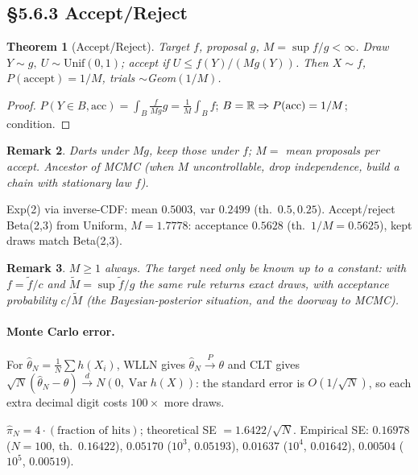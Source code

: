 \documentclass[11pt]{article}
\newtheorem{theorem}{Theorem}[section]
\newtheorem{remark}[theorem]{Remark}
\DeclareMathOperator{\Var}{Var}\DeclareMathOperator{\Cov}{Cov}\DeclareMathOperator{\E}{E}
\newcommand{\convP}{\xrightarrow{P}}\newcommand{\convD}{\xrightarrow{d}}\newcommand{\convAS}{\xrightarrow{a.s.}}
\begin{document}
\subsection*{\S5.6.3 Accept/Reject}
\begin{theorem}[Accept/Reject]
Target $f$, proposal $g$, $M=\sup f/g<\infty$. Draw $Y\sim g,\ U\sim\mathrm{Unif}(0,1)$; accept if $U\le f(Y)/(Mg(Y))$. Then $X\sim f$, $P(\text{accept})=1/M$, trials $\sim$Geom$(1/M)$.
\end{theorem}
\begin{proof}
$P(Y\in B,\text{acc})=\int_B\frac{f}{Mg}g=\frac1M\int_B f$; $B=\mathbb{R}\Rightarrow P(\text{acc})=1/M$; condition.
\end{proof}
\begin{remark}
Darts under $Mg$, keep those under $f$; $M=$ mean proposals per accept. Ancestor of MCMC (when $M$ uncontrollable, drop independence, build a chain with stationary law $f$).
\end{remark}
\begin{simbox}
Exp(2) via inverse-CDF: mean $0.5003$, var $0.2499$ (th.\ $0.5,0.25$). Accept/reject Beta(2,3) from Uniform, $M=1.7778$: acceptance $0.5628$ (th.\ $1/M=0.5625$), kept draws match Beta(2,3).
\end{simbox}

\begin{remark}
$M\ge1$ always. The target need only be known up to a constant: with $f=\tilde f/c$ and $\tilde M=\sup\tilde f/g$ the same rule returns exact draws, with acceptance probability $c/\tilde M$ (the Bayesian-posterior situation, and the doorway to MCMC).
\end{remark}
\paragraph{Monte Carlo error.} For $\hat\theta_N=\frac1N\sum h(X_i)$, WLLN gives $\hat\theta_N\convP\theta$ and CLT gives $\sqrt N(\hat\theta_N-\theta)\convD N(0,\Var h(X))$: the standard error is $O(1/\sqrt N)$, so each extra decimal digit costs $100\times$ more draws.
\begin{simbox}
$\hat\pi_N=4\cdot(\text{fraction of hits})$; theoretical SE $=1.6422/\sqrt N$. Empirical SE: $0.16978$ ($N=100$, th.\ $0.16422$), $0.05170$ ($10^3$, $0.05193$), $0.01637$ ($10^4$, $0.01642$), $0.00504$ ($10^5$, $0.00519$).
\end{simbox}
\end{document}

